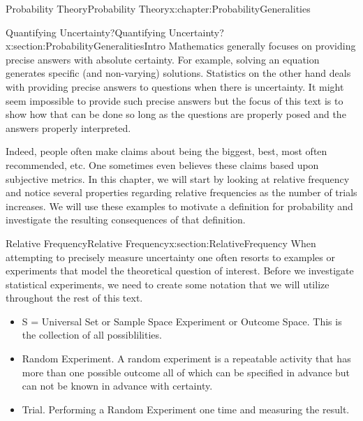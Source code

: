 \documentclass[oneside,10pt,]{book}
\numberwithin{equation}{section}
\begin{document}
\begin{chapterptx}{Probability Theory}{}{Probability Theory}{}{}{x:chapter:ProbabilityGeneralities}
%
%
\typeout{************************************************}
\typeout{************************************************}
%
\begin{sectionptx}{Quantifying Uncertainty?}{}{Quantifying Uncertainty?}{}{}{x:section:ProbabilityGeneralitiesIntro}
Mathematics generally focuses on providing precise answers with absolute certainty. For example, solving an equation generates specific (and non-varying) solutions. Statistics on the other hand deals with providing precise answers to questions when there is uncertainty. It might seem impossible to provide such precise answers but the focus of this text is to show how that can be done so long as the questions are properly posed and the answers properly interpreted.%
\par
Indeed, people often make claims about being the biggest, best, most often recommended, etc. One sometimes even believes these claims based upon subjective metrics. In this chapter, we will start by looking at relative frequency and notice several properties regarding relative frequencies as the number of trials increases. We will use these examples to motivate a definition for probability and investigate the resulting consequences of that definition.%
\end{sectionptx}
%
%
\typeout{************************************************}
\typeout{************************************************}
%
\begin{sectionptx}{Relative Frequency}{}{Relative Frequency}{}{}{x:section:RelativeFrequency}
When attempting to precisely measure uncertainty one often resorts to examples or experiments that model the theoretical question of interest. Before we investigate statistical experiments, we need to create some notation that we will utilize throughout the rest of this text.%
%
\begin{itemize}[label=\textbullet]
\item{}S = Universal Set or Sample Space Experiment or Outcome Space. This is the collection of all possiblilities.%
\item{}Random Experiment. A random experiment is a repeatable activity that has more than one possible outcome all of which can be specified in advance but can not be known in advance with certainty.%
\item{}Trial. Performing a Random Experiment one time and measuring the result.%

\end{itemize}
\end{sectionptx}
\end{chapterptx}
\end{document}
